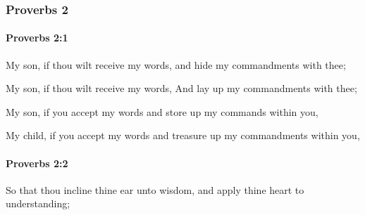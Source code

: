 	\subsubsection{Proverbs 2} %
		\label{PROVERBS-2}

		\paragraph{Proverbs 2:1} %
			\label{PROVERBS-2-1}

			My son, if thou wilt receive my words, and hide my commandments with thee;

			\begin{versebox}
					\item[BHS] 
					\item[ASV] My son, if thou wilt receive my words, And lay up my commandments with thee;
					\item[NIV] My son, if you accept my words and store up my commands within you,
					\item[NRSV] My child, if you accept my words and treasure up my commandments within you,
			\end{versebox}

		\paragraph{Proverbs 2:2} %
			\label{PROVERBS-2-2}

			So that thou incline thine ear unto wisdom, and apply thine heart to understanding;

